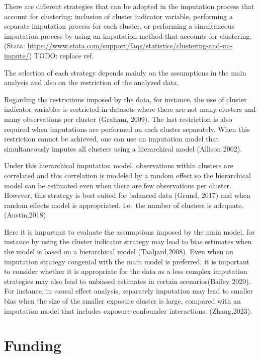 \documentclass[
]{jss}
\begin{document}
There are different strategies that can be adopted in the imputation
process that account for clustering: inclusion of cluster indicator
variable, performing a separate imputation process for each cluster, or
performing a simultaneous imputation process by using an imputation
method that accounts for clustering.(Stata:
\url{https://www.stata.com/support/faqs/statistics/clustering-and-mi-impute/})
TODO: replace ref.

The selection of each strategy depends mainly on the assumptions in the
main analysis and also on the restriction of the analyzed data.

Regarding the restrictions imposed by the data, for instance, the use of
cluster indicator variables is restricted in datasets where there are
not many clusters and many observations per cluster (Graham, 2009). The
last restriction is also required when imputations are performed on each
cluster separately. When this restriction cannot be achieved, one can
use an imputation model that simultaneously imputes all clusters using a
hierarchical model (Allison 2002).

Under this hierarchical imputation model, observations within clusters
are correlated and this correlation is modeled by a random effect so the
hierarchical model can be estimated even when there are few observations
per cluster. However, this strategy is best suited for balanced data
(Grund, 2017) and when random effects model is appropriated, i.e.~the
number of clusters is adequate. (Austin,2018).

Here it is important to evaluate the assumptions imposed by the main
model, for instance by using the cluster indicator strategy may lead to
bias estimates when the model is based on a hierarchical model
(Taaljard,2008). Even when an imputation strategy congenial with the
main model is preferred, it is important to consider whether it is
appropriate for the data as a less complex imputation strategies may
also lead to unbiased estimates in certain scenarios(Bailey 2020). For
instance, in causal effect analysis, separately imputation may lead to
smaller bias when the size of the smaller exposure cluster is large,
compared with an imputation model that includes exposure-confounder
interactions. (Zhang,2023).

\hypertarget{funding}{%
\section{Funding}\label{funding}}
\end{document}
